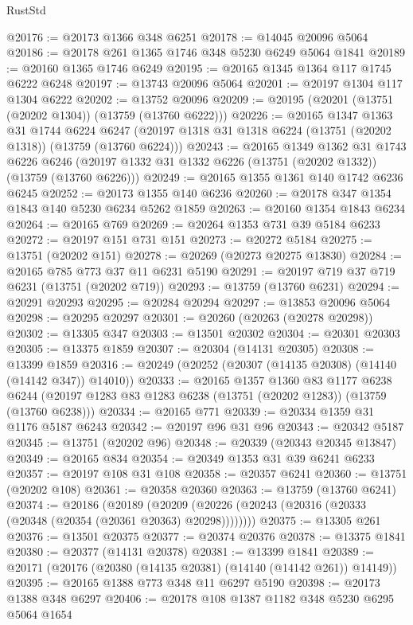 \begin{lexlean}{RustStd}
\begin{coremodule}
@20176 := @20173 @1366 @348 @6251
@20178 := @14045 @20096 @5064
@20186 := @20178 @261 @1365 @1746 @348 @5230 @6249 @5064 @1841
@20189 := @20160 @1365 @1746 @6249
@20195 := @20165 @1345 @1364 @117 @1745 @6222 @6248
@20197 := @13743 @20096 @5064
@20201 := @20197 @1304 @117 @1304 @6222
@20202 := @13752 @20096
@20209 := @20195 (@20201 (@13751 (@20202 @1304)) (@13759 (@13760 @6222)))
@20226 := @20165
    @1347
    @1363
    @31
    @1744
    @6224
    @6247
    (@20197 @1318 @31 @1318 @6224 (@13751 (@20202 @1318)) (@13759 (@13760 @6224)))
@20243 := @20165
    @1349
    @1362
    @31
    @1743
    @6226
    @6246
    (@20197 @1332 @31 @1332 @6226 (@13751 (@20202 @1332)) (@13759 (@13760 @6226)))
@20249 := @20165 @1355 @1361 @140 @1742 @6236 @6245
@20252 := @20173 @1355 @140 @6236
@20260 := @20178 @347 @1354 @1843 @140 @5230 @6234 @5262 @1859
@20263 := @20160 @1354 @1843 @6234
@20264 := @20165 @769
@20269 := @20264 @1353 @731 @39 @5184 @6233
@20272 := @20197 @151 @731 @151
@20273 := @20272 @5184
@20275 := @13751 (@20202 @151)
@20278 := @20269 (@20273 @20275 @13830)
@20284 := @20165 @785 @773 @37 @11 @6231 @5190
@20291 := @20197 @719 @37 @719 @6231 (@13751 (@20202 @719))
@20293 := @13759 (@13760 @6231)
@20294 := @20291 @20293
@20295 := @20284 @20294
@20297 := @13853 @20096 @5064
@20298 := @20295 @20297
@20301 := @20260 (@20263 (@20278 @20298))
@20302 := @13305 @347
@20303 := @13501 @20302
@20304 := @20301 @20303
@20305 := @13375 @1859
@20307 := @20304 (@14131 @20305)
@20308 := @13399 @1859
@20316 := @20249 (@20252 (@20307 (@14135 @20308) (@14140 (@14142 @347)) @14010))
@20333 := @20165
    @1357
    @1360
    @83
    @1177
    @6238
    @6244
    (@20197 @1283 @83 @1283 @6238 (@13751 (@20202 @1283)) (@13759 (@13760 @6238)))
@20334 := @20165 @771
@20339 := @20334 @1359 @31 @1176 @5187 @6243
@20342 := @20197 @96 @31 @96
@20343 := @20342 @5187
@20345 := @13751 (@20202 @96)
@20348 := @20339 (@20343 @20345 @13847)
@20349 := @20165 @834
@20354 := @20349 @1353 @31 @39 @6241 @6233
@20357 := @20197 @108 @31 @108
@20358 := @20357 @6241
@20360 := @13751 (@20202 @108)
@20361 := @20358 @20360
@20363 := @13759 (@13760 @6241)
@20374 := @20186
    (@20189 (@20209 (@20226 (@20243 (@20316 (@20333 (@20348 (@20354 (@20361 @20363) @20298))))))))
@20375 := @13305 @261
@20376 := @13501 @20375
@20377 := @20374 @20376
@20378 := @13375 @1841
@20380 := @20377 (@14131 @20378)
@20381 := @13399 @1841
@20389 := @20171 (@20176 (@20380 (@14135 @20381) (@14140 (@14142 @261)) @14149))
@20395 := @20165 @1388 @773 @348 @11 @6297 @5190
@20398 := @20173 @1388 @348 @6297
@20406 := @20178 @108 @1387 @1182 @348 @5230 @6295 @5064 @1654

\end{coremodule}
\end{lexlean}
